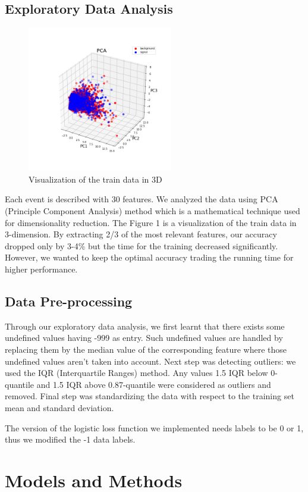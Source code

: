 \documentclass[10pt,conference,compsocconf]{IEEEtran}
\begin{document}
\subsection{Exploratory Data Analysis}
\begin{figure}[h]
  \centering
  \includegraphics[width=2.5in]{pca.png}
  \caption{Visualization of the train data in 3D}
  \label{fig:pca}
\end{figure}

Each event is described with 30 features. We analyzed the data using PCA (Principle Component Analysis) method which is a mathematical technique used for dimensionality reduction. The Figure 1 is a visualization of the train data in 3-dimension.
By extracting 2/3 of the most relevant features, our accuracy dropped only by 3-4\% but the time for the training decreased significantly. However, we wanted to keep the optimal accuracy trading the running time for higher performance.

\subsection{Data Pre-processing}
Through our exploratory data analysis, we first learnt that there exists some undefined values having -999 as entry. Such undefined values are handled by replacing them by the median value of the corresponding feature where those undefined values aren't taken into account. Next step was detecting outliers: we used the IQR (Interquartile Ranges) method. Any values 1.5 IQR below 0-quantile and 1.5 IQR above 0.87-quantile were considered as outliers and removed. Final step was standardizing the data with respect to the training set mean and standard deviation.

The version of the logistic loss function we implemented needs labels to be 0 or 1, thus we modified the -1 data labels.

\section{Models and Methods}
\label{sec:model}
\end{document}
